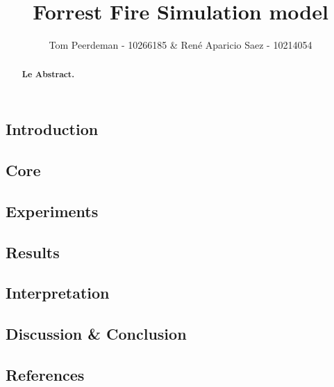 \documentclass{article}
\title{Forrest Fire Simulation model}
\author{Tom Peerdeman - 10266185 \& Ren\'e Aparicio Saez - 10214054}
\begin{document}
\maketitle

\begin{abstract}
\textbf{Le Abstract.}
\end{abstract}

\begin{multicols}{2}
\subsection*{Introduction}

\subsection*{Core}
\subsection*{Experiments}
\subsection*{Results}
\subsection*{Interpretation}

\subsection*{Discussion \& Conclusion}

\subsection*{References}
\end{multicols}
\newpage


\end{document}
